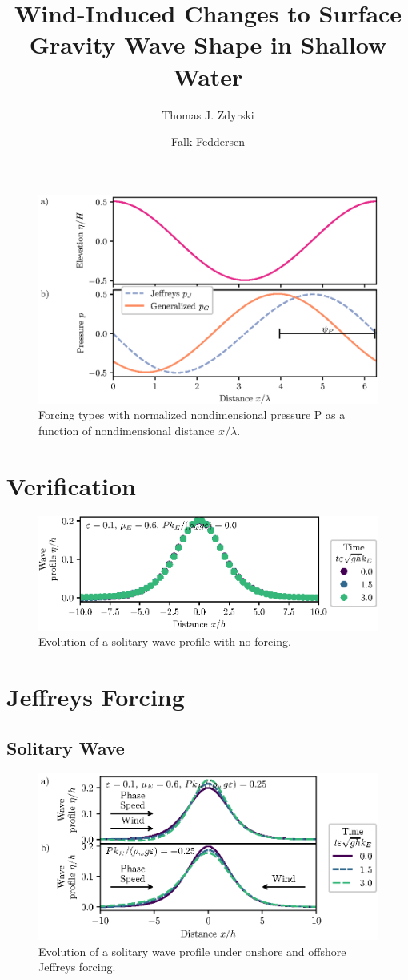 \documentclass{jfm}
\title{Wind-Induced Changes to Surface Gravity Wave Shape in Shallow Water}
\author{Thomas J. Zdyrski \and Falk Feddersen}
\let\Oldsection\section
\renewcommand{\section}{\FloatBarrier\Oldsection}
\let\Oldsubsection\subsection
\renewcommand{\subsection}{\FloatBarrier\Oldsubsection}
\begin{document}
\begin{figure}
  \centering
  \includegraphics{Forcing-Types.eps}
  \caption{
    Forcing types with normalized nondimensional pressure P as a
    function of nondimensional distance $x/\lambda$.
  }
\end{figure}

\section{Verification}
\begin{figure}
  \centering
  \includegraphics{Solitary-Verf.eps}
  \caption{
    Evolution of a solitary wave profile with no forcing.
  }
\end{figure}

\section{Jeffreys Forcing}
\subsection{Solitary Wave}
\begin{figure}
  \centering
  \includegraphics{Snapshots-Positive-Negative.eps}
  \caption{
    Evolution of a solitary wave profile under onshore and offshore Jeffreys
    forcing.
  }
\end{figure}
\end{document}
